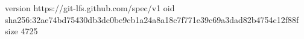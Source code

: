 version https://git-lfs.github.com/spec/v1
oid sha256:32ae74bd75430db3dc0be9cb1a24a8a18c7f771e39c69a3dad82b4754c12f88f
size 4725
